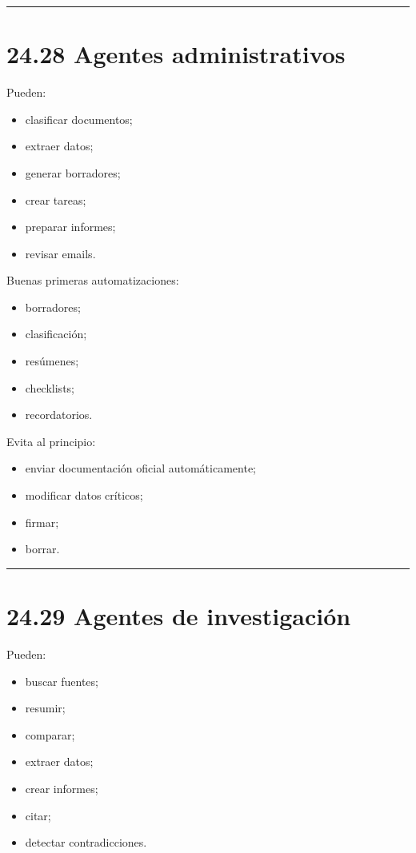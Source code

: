 \begin{center}\rule{0.5\linewidth}{0.5pt}\end{center}

\section{24.28 Agentes administrativos}\label{agentes-administrativos}

Pueden:

\begin{itemize}
\tightlist
\item
  clasificar documentos;
\item
  extraer datos;
\item
  generar borradores;
\item
  crear tareas;
\item
  preparar informes;
\item
  revisar emails.
\end{itemize}

Buenas primeras automatizaciones:

\begin{itemize}
\tightlist
\item
  borradores;
\item
  clasificación;
\item
  resúmenes;
\item
  checklists;
\item
  recordatorios.
\end{itemize}

Evita al principio:

\begin{itemize}
\tightlist
\item
  enviar documentación oficial automáticamente;
\item
  modificar datos críticos;
\item
  firmar;
\item
  borrar.
\end{itemize}

\begin{center}\rule{0.5\linewidth}{0.5pt}\end{center}

\section{24.29 Agentes de
investigación}\label{agentes-de-investigaciuxf3n}

Pueden:

\begin{itemize}
\tightlist
\item
  buscar fuentes;
\item
  resumir;
\item
  comparar;
\item
  extraer datos;
\item
  crear informes;
\item
  citar;
\item
  detectar contradicciones.
\end{itemize}

